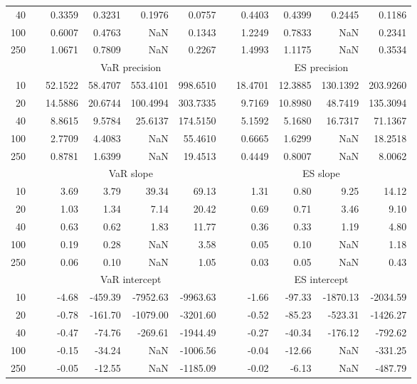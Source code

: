 {{\begin{longtable}{rr rrrr r rrrr}
40 && 0.3359  & 0.3231  & 0.1976 & 0.0757 && 0.4403  & 0.4399  & 0.2445 & 0.1186 \\ 
100 && 0.6007  & 0.4763  &    NaN & 0.1343 && 1.2249  & 0.7833  &    NaN & 0.2341 \\ 
250 && 1.0671  & 0.7809  &    NaN & 0.2267 && 1.4993  & 1.1175  &    NaN & 0.3534 \\ 
\hline 
 & & \multicolumn{4}{c}{VaR precision} &&  \multicolumn{4}{c}{ES precision} \\ \cline{3-6}  \cline{8-11}
10 && 52.1522 & 58.4707 & 553.4101 & 998.6510 & & 18.4701 & 12.3885 & 130.1392 & 203.9260 \\ 
20 && 14.5886 & 20.6744 & 100.4994 & 303.7335 & & 9.7169 & 10.8980 & 48.7419 & 135.3094 \\ 
40 && 8.8615 & 9.5784 & 25.6137 & 174.5150 & & 5.1592 & 5.1680 & 16.7317 & 71.1367 \\ 
100 && 2.7709 & 4.4083 &    NaN & 55.4610 & & 0.6665 & 1.6299 &    NaN & 18.2518 \\ 
250 && 0.8781 & 1.6399 &    NaN & 19.4513 & & 0.4449 & 0.8007 &    NaN & 8.0062 \\ 
\hline 
 & & \multicolumn{4}{c}{ VaR slope} && \multicolumn{4}{c}{ES slope} \\ \cline{3-6}  \cline{8-11}
10 && 3.69 & 3.79 & 39.34 & 69.13 && 1.31 & 0.80 & 9.25 & 14.12 \\ 
20 && 1.03 & 1.34 & 7.14 & 20.42 && 0.69 & 0.71 & 3.46 & 9.10 \\ 
40 && 0.63 & 0.62 & 1.83 & 11.77 && 0.36 & 0.33 & 1.19 & 4.80 \\ 
100 && 0.19 & 0.28 &  NaN & 3.58 && 0.05 & 0.10 &  NaN & 1.18 \\ 
250 && 0.06 & 0.10 &  NaN & 1.05 && 0.03 & 0.05 &  NaN & 0.43 \\ 
\hline 
 & & \multicolumn{4}{c}{ VaR intercept} &&  \multicolumn{4}{c}{ES intercept} \\ \cline{3-6}  \cline{8-11}
10 && -4.68 & -459.39 & -7952.63 & -9963.63 && -1.66 & -97.33 & -1870.13 & -2034.59 \\ 
20 && -0.78 & -161.70 & -1079.00 & -3201.60 && -0.52 & -85.23 & -523.31 & -1426.27 \\ 
40 && -0.47 & -74.76 & -269.61 & -1944.49 && -0.27 & -40.34 & -176.12 & -792.62 \\ 
100 && -0.15 & -34.24 &  NaN & -1006.56 && -0.04 & -12.66 &  NaN & -331.25 \\ 
250 && -0.05 & -12.55 &  NaN & -1185.09 && -0.02 & -6.13 &  NaN & -487.79 \\ 

\end{longtable}}}
